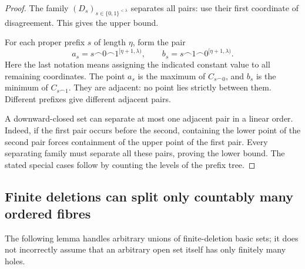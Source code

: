 \documentclass[11pt,a4paper]{article}
\newtheorem{proposition}[theorem]{Proposition}
\theoremstyle{definition}
\theoremstyle{remark}
\newcommand{\sep}{\operatorname{sep}}
\newcommand{\dd}{\downarrow}
\newcommand{\cat}{\mathbin{\frown}}
\newcommand{\two}{\{0,1\}}
\newcommand{\cfr}{\mathfrak c}
\begin{document}
\begin{proof}
The family $(D_s)_{s\in\two^{<\lambda}}$ separates all pairs: use their first
coordinate of disagreement. This gives the upper bound.

For each proper prefix $s$ of length $\eta$, form the pair
\[
 a_s=s\cat0\cat1^{[\eta+1,\lambda)},\qquad
 b_s=s\cat1\cat0^{[\eta+1,\lambda)}.
\]
Here the last notation means assigning the indicated constant value to all
remaining coordinates. The point $a_s$ is the maximum of $C_{s\cat0}$, and
$b_s$ is the minimum of $C_{s\cat1}$. They are adjacent: no point lies strictly
between them. Different prefixes give different adjacent pairs.

A downward-closed set can separate at most one adjacent pair in a linear order.
Indeed, if the first pair occurs before the second, containing the lower point
of the second pair forces containment of the upper point of the first pair.
Every separating family must separate all these pairs, proving the lower bound.
The stated special cases follow by counting the levels of the prefix tree.
\end{proof}

\subsection{Finite deletions can split only countably many ordered fibres}
The following lemma handles arbitrary unions of finite-deletion basic sets;
it does not incorrectly assume that an arbitrary open set itself has only
finitely many holes.
\end{document}
